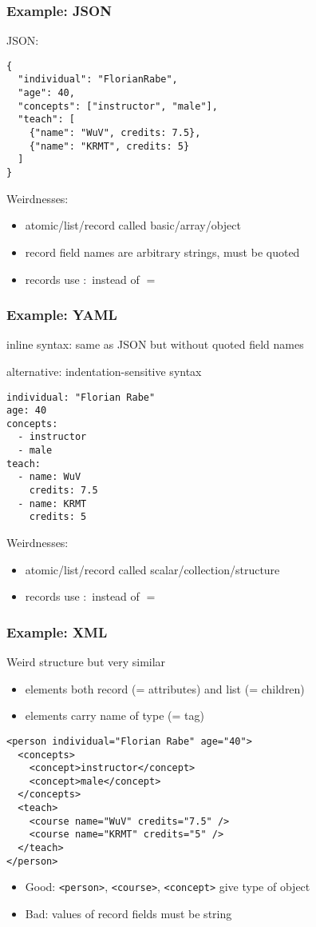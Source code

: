 \begin{frame}[fragile]\frametitle{Example: JSON}
JSON:
\begin{lstlisting}[basicstyle=\footnotesize]
{
  "individual": "FlorianRabe",
  "age": 40,
  "concepts": ["instructor", "male"],
  "teach": [
    {"name": "WuV", credits: 7.5},
    {"name": "KRMT", credits: 5}
  ]
}
\end{lstlisting}

Weirdnesses:
\begin{itemize}
\item atomic/list/record called basic/array/object
\item record field names are arbitrary strings, must be quoted
\item records use $:$ instead of $=$
\end{itemize}
\end{frame}

\begin{frame}[fragile]\frametitle{Example: YAML}
inline syntax: same as JSON but without quoted field names

alternative: indentation-sensitive syntax
\begin{lstlisting}[basicstyle=\footnotesize]
individual: "Florian Rabe"
age: 40
concepts:
  - instructor
  - male
teach:
  - name: WuV
    credits: 7.5
  - name: KRMT
    credits: 5
\end{lstlisting}

Weirdnesses:
\begin{itemize}
\item atomic/list/record called scalar/collection/structure
\item records use $:$ instead of $=$
\end{itemize}
\end{frame}

\begin{frame}[fragile]\frametitle{Example: XML}
Weird structure but very similar
\begin{itemize}
\item elements both record (= attributes) and list (= children)
\item elements carry name of type (= tag)
\end{itemize}

\begin{lstlisting}[basicstyle=\footnotesize]
<person individual="Florian Rabe" age="40">
  <concepts>
    <concept>instructor</concept>
    <concept>male</concept>
  </concepts>
  <teach>
    <course name="WuV" credits="7.5" />
    <course name="KRMT" credits="5" />
  </teach>
</person>
\end{lstlisting}

\begin{itemize}
\item Good: \lstinline|<person>|, \lstinline|<course>|, \lstinline|<concept>| give type of object
\item Bad: values of record fields must be string
\end{itemize}
\end{frame}

